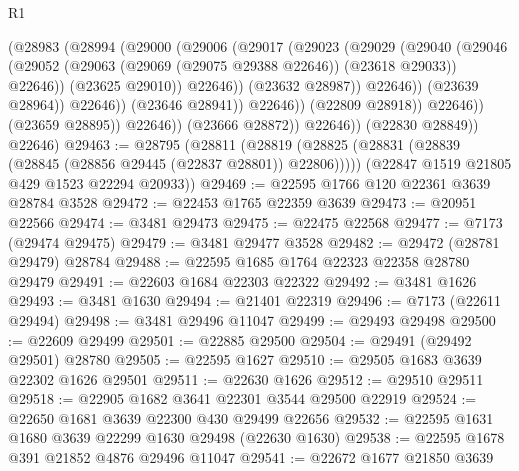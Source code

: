 \begin{lexlean}{R1}
\begin{coremodule}
                                  (@28983
                                    (@28994
                                      (@29000
                                        (@29006
                                          (@29017
                                            (@29023
                                              (@29029
                                                (@29040
                                                  (@29046
                                                    (@29052
                                                      (@29063
                                                        (@29069 (@29075 @29388 @22646))
                                                        (@23618 @29033))
                                                      @22646))
                                                  (@23625 @29010))
                                                @22646))
                                            (@23632 @28987))
                                          @22646))
                                      (@23639 @28964))
                                    @22646))
                                (@23646 @28941))
                              @22646))
                          (@22809 @28918))
                        @22646))
                    (@23659 @28895))
                  @22646))
              (@23666 @28872))
            @22646))
        (@22830 @28849))
      @22646)
@29463 := @28795
    (@28811
      (@28819 (@28825 (@28831 (@28839 (@28845 (@28856 @29445 (@22837 @28801)) @22806)))))
      (@22847 @1519 @21805 @429 @1523 @22294 @20933))
@29469 := @22595 @1766 @120 @22361 @3639 @28784 @3528
@29472 := @22453 @1765 @22359 @3639
@29473 := @20951 @22566
@29474 := @3481 @29473
@29475 := @22475 @22568
@29477 := @7173 (@29474 @29475)
@29479 := @3481 @29477 @3528
@29482 := @29472 (@28781 @29479) @28784
@29488 := @22595 @1685 @1764 @22323 @22358 @28780 @29479
@29491 := @22603 @1684 @22303 @22322
@29492 := @3481 @1626
@29493 := @3481 @1630
@29494 := @21401 @22319
@29496 := @7173 (@22611 @29494)
@29498 := @3481 @29496 @11047
@29499 := @29493 @29498
@29500 := @22609 @29499
@29501 := @22885 @29500
@29504 := @29491 (@29492 @29501) @28780
@29505 := @22595 @1627
@29510 := @29505 @1683 @3639 @22302 @1626 @29501
@29511 := @22630 @1626
@29512 := @29510 @29511
@29518 := @22905 @1682 @3641 @22301 @3544 @29500 @22919
@29524 := @22650 @1681 @3639 @22300 @430 @29499 @22656
@29532 := @22595 @1631 @1680 @3639 @22299 @1630 @29498 (@22630 @1630)
@29538 := @22595 @1678 @391 @21852 @4876 @29496 @11047
@29541 := @22672 @1677 @21850 @3639

\end{coremodule}
\end{lexlean}
